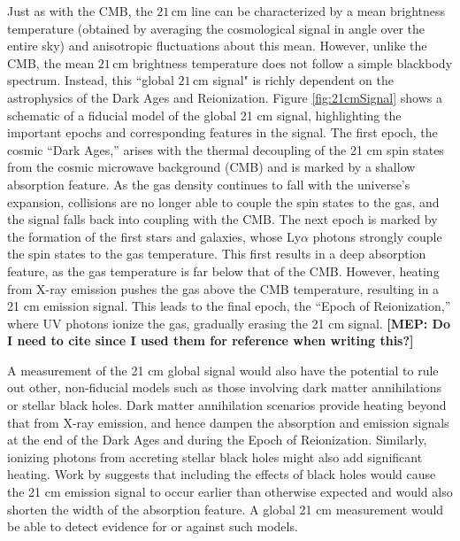 \documentclass[twolcolumn,apj,iop,numberedappendix]{emulateapj}
\newcommand{\mep}[1]{{\color{applegreen} \textbf{[MEP:  #1]}}}
\begin{document}
Just as with the CMB, the $21\,\textrm{cm}$ line can be characterized by a mean brightness temperature (obtained by averaging the cosmological signal in angle over the entire sky) and anisotropic fluctuations about this mean. However, unlike the CMB, the mean $21\,\textrm{cm}$ brightness temperature does not follow a simple blackbody spectrum. Instead, this ``global $21\,\textrm{cm}$ signal" is richly dependent on the astrophysics of the Dark Ages and Reionization. Figure \ref{fig:21cmSignal} shows a schematic of a fiducial model of the global 21 cm signal, highlighting the important epochs and corresponding features in the signal. The first epoch, the cosmic ``Dark Ages,'' arises with the thermal decoupling of the 21 cm spin states from the cosmic microwave background (CMB) and is marked by a shallow absorption feature. As the gas density continues to fall with the universe's expansion, collisions are no longer able to couple the spin states to the gas, and the signal falls back into coupling with the CMB. The next epoch is marked by the formation of the first stars and galaxies, whose Ly$\alpha$ photons strongly couple the spin states to the gas temperature. This first results in a deep absorption feature, as the gas temperature is far below that of the CMB. However, heating from X-ray emission pushes the gas above the CMB temperature, resulting in a 21 cm emission signal. This leads to the final epoch, the ``Epoch of Reionization,'' where UV photons ionize the gas, gradually erasing the 21 cm signal. \mep{Do I need to cite \citet{Pritchard_Loeb_21cm_Review} since I used them for reference when writing this?} 

A measurement of the 21 cm global signal would also have the potential to rule out other, non-fiducial models such as those involving dark matter annihilations or stellar black holes. Dark matter annihilation scenarios provide heating beyond that from X-ray emission, and hence dampen the absorption and emission signals at the end of the Dark Ages and during the Epoch of Reionization. \citep{Valdes2013_DM} Similarly, ionizing photons from accreting stellar black holes might also add significant heating. Work by \citet{Mirabel_stellar_bh} suggests that including the effects of black holes would cause the 21 cm emission signal to occur earlier than otherwise expected and would also shorten the width of the absorption feature. A global 21 cm measurement would be able to detect evidence for or against such models. 
\end{document}
